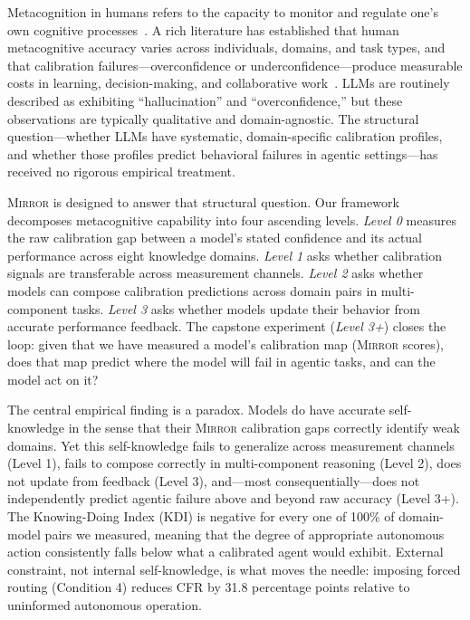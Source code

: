\documentclass[10pt]{article}
\newcommand{\mirror}{\textsc{Mirror}}
\newcommand{\KDI}{KDI}
\newcommand{\CFR}{CFR}
\begin{document}
Metacognition in humans refers to the capacity to monitor and regulate one's own cognitive
processes~\citep{flavell1979metacognition}. A rich literature has established that human
metacognitive accuracy varies across individuals, domains, and task types, and that
calibration failures---overconfidence or underconfidence---produce measurable costs in
learning, decision-making, and collaborative work~\citep{dunning2011dunning,
krueger2002unskilled, koriat2007toward}. LLMs are routinely described as exhibiting
``hallucination'' and ``overconfidence,'' but these observations are typically qualitative
and domain-agnostic. The structural question---whether LLMs have systematic,
domain-specific calibration profiles, and whether those profiles predict behavioral
failures in agentic settings---has received no rigorous empirical treatment.

\mirror{} is designed to answer that structural question. Our framework decomposes
metacognitive capability into four ascending levels. \textit{Level 0} measures the
raw calibration gap between a model's stated confidence and its actual performance
across eight knowledge domains. \textit{Level 1} asks whether calibration signals
are transferable across measurement channels. \textit{Level 2} asks whether models
can compose calibration predictions across domain pairs in multi-component tasks.
\textit{Level 3} asks whether models update their behavior from accurate performance
feedback. The capstone experiment (\textit{Level 3+}) closes the loop: given that
we have measured a model's calibration map (\mirror{} scores), does that map predict
where the model will fail in agentic tasks, and can the model act on it?

The central empirical finding is a paradox. Models do have accurate self-knowledge
in the sense that their \mirror{} calibration gaps correctly identify weak domains.
Yet this self-knowledge fails to generalize across measurement channels (Level 1),
fails to compose correctly in multi-component reasoning (Level 2), does not update
from feedback (Level 3), and---most consequentially---does not independently predict
agentic failure above and beyond raw accuracy (Level 3+). The Knowing-Doing Index
(\KDI) is negative for every one of 100\% of domain-model pairs we measured, meaning
that the degree of appropriate autonomous action consistently falls below what a
calibrated agent would exhibit. External constraint, not internal self-knowledge,
is what moves the needle: imposing forced routing (Condition 4) reduces \CFR{}
by 31.8 percentage points relative to uninformed autonomous operation.
\end{document}

